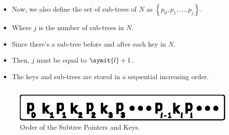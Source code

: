 \begin{frame}
    \begin{columns}
        \begin{column}{\textlecolumn}
            \begin{block}{}
                \begin{itemize}
                    \item Now, we also define the set of sub-trees of \(N\) as \(\left\{p_0, p_1, \ldots{}, p_j\right\}\).
                    \item Where \(j\) is the number of sub-trees in \(N\).
                    \item Since there's a sub-tree before and after each key in \(N\).
                    \item Then, \(j\) must be equal to \(\symit{l} + 1\).
                    \item The keys and sub-trees are stored in a sequential increasing order.
                \end{itemize}
            \end{block}
        \end{column}
        \begin{column}{\textricolumn}
        \end{column}
    \end{columns}
    \begin{figure}[h!]
        \includegraphics[width=0.85\linewidth]{resources/made/key_subtree_order.eps}
        \caption{Order of the Subtree Pointers and Keys.}
    \end{figure}

    \framebreak


\end{frame}
